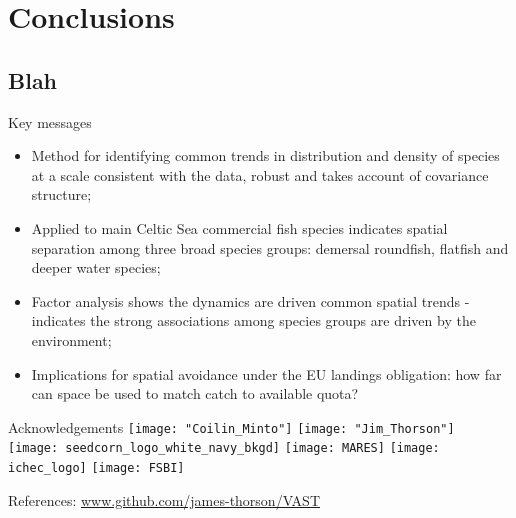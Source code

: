\documentclass[xcolor=x11names,compress]{beamer}
\renewcommand{\(}{\begin{columns}}
\renewcommand{\)}{\end{columns}}
\newcommand{\<}[1]{\begin{column}{#1}}
\renewcommand{\>}{\end{column}}
\begin{document}
\section{Conclusions}
\subsection{Blah}

\begin{frame}{Key messages}
\begin{itemize}
\small	
\setlength\itemsep{1em}
	\item Method for identifying common trends in distribution and density
		of species at a scale consistent with the data, robust and
		takes account of covariance structure;
	\item Applied to main Celtic Sea commercial fish species indicates
		spatial separation among three broad species groups: demersal
		roundfish, flatfish and deeper water species;
	\item Factor analysis shows the dynamics are driven common spatial
		trends - indicates the strong associations among species groups
		are driven by the environment; 
	\item Implications for spatial avoidance under the EU landings
		obligation: how far can space be used to match catch to
		available quota?
\end{itemize}

\end{frame}


\begin{frame}{Acknowledgements}
\centering
\texttt{[image: "Coilin\_Minto"]} \hspace{1cm}
\texttt{[image: "Jim\_Thorson"]} \\
\vspace{1cm}
\texttt{[image: seedcorn\_logo\_white\_navy\_bkgd]} 
\hspace{0.5cm}
\texttt{[image: MARES]}  
\hspace{0.5cm}
\texttt{[image: ichec\_logo]} 
\hspace{0.5cm}
\texttt{[image: FSBI]} 

\tiny 
References: \url{www.github.com/james-thorson/VAST}

\end{frame}
\end{document}
